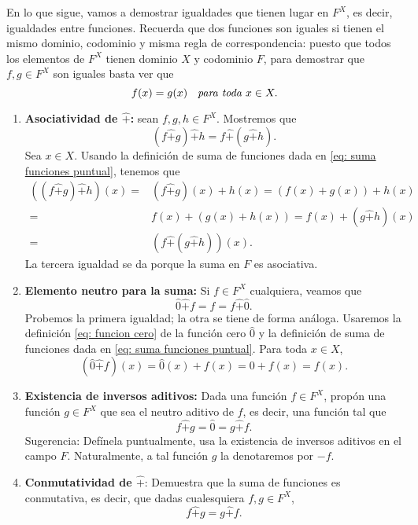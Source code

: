 En lo que sigue, vamos a demostrar igualdades que tienen lugar
en $F^{X}$, es decir, igualdades entre funciones.
Recuerda que dos funciones son iguales si tienen el mismo dominio,
codominio y misma regla de correspondencia: puesto que todos los 
elementos de $F^{X}$ tienen dominio $X$ y codominio $F$, para
demostrar que $f, g \in F^{X}$ son iguales basta ver que
\[
f(x) = g (x) \hspace{0.2cm}
\textit{ para toda } x \in X.
\]

\begin{enumerate}
	\item \textbf{Asociatividad de $\hat{+}$:}
	sean $f, g, h \in F^{X}$. Mostremos que 
	\[
	(f \hat{+} g) \hat{+} h = f \hat{+} ( g \hat{+} h).
	\]
	Sea $x \in X$.
	Usando la definición de suma de funciones dada en 
	\eqref{eq: suma funciones puntual},
	tenemos que 
	\begin{align*}
	((f \hat{+} g) \hat{+} h )(x) = &
	(f \hat{+} g)(x) + h(x)
	= (f(x) + g(x)) + h(x) \\
	= & f(x) + (g(x) + h(x)) = f(x) + (g \hat{+} h)(x) \\
	= & (f \hat{+} (g \hat{+} h)) (x).
	\end{align*}
	La tercera igualdad se da porque la suma en $F$
	es asociativa.
	
	\item \textbf{Elemento neutro para la suma:}
	Si $f \in F^{X}$ cualquiera, veamos que
	\[
	\hat{0} \hat{+} f = f = f \hat{+} \hat{0}.
	\]
	Probemos la primera igualdad; la otra se tiene de forma 
	análoga. Usaremos la definición 
	\eqref{eq: funcion cero}
	de la función cero $\hat{0}$ y la definición de suma de funciones dada en 
	\eqref{eq: suma funciones puntual}.
	Para toda $x \in X$,
	\[
	(\hat{0} \hat{+} f) (x) = 
	\hat{0}(x) + f(x) = 0 + f(x) = f(x).
	\]
	
	\item \textbf{Existencia de inversos aditivos:}
	 Dada una función $f \in F^{X}$, propón
	una función $g \in F^{X}$ que sea el neutro
	aditivo de $f$, es decir, una función tal que
	\[
	f \hat{+} g = \hat{0} = g \hat{+} f.
	\]
	Sugerencia: Defínela puntualmente, usa la existencia
	de inversos aditivos en el campo $F$.
	Naturalmente, a tal función $g$ la denotaremos por $-f$.
	
	\item \textbf{Conmutatividad de $\hat{+}$}:
	 Demuestra que la suma de funciones
	es conmutativa, es decir, que dadas cualesquiera
	$f, g \in F^{X}$, 
	\[
	f \hat{+} g = g \hat{+} f.
	\]
	

\end{enumerate}
